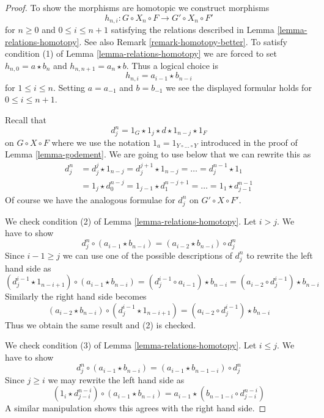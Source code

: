 \begin{proof}
To show the morphisms are homotopic we construct morphisms
$$
h_{n, i} : G \circ X_n \circ F \to G' \circ X_n \circ F'
$$
for $n \geq 0$ and $0 \leq i \leq n + 1$
satisfying the relations described in Lemma \ref{lemma-relations-homotopy}.
See also Remark \ref{remark-homotopy-better}. To satisfy condition (1)
of Lemma \ref{lemma-relations-homotopy} we are forced to set
$h_{n, 0} = a \star b_n$ and $h_{n , n + 1} = a_n \star b$.
Thus a logical choice is
$$
h_{n , i} = a_{i - 1} \star b_{n - i}
$$
for $1 \leq i \leq n$. Setting $a = a_{-1}$ and $b = b_{-1}$ we
see the displayed formular holds for $0 \leq i \leq n + 1$.

\medskip\noindent
Recall that
$$
d^n_j = 1_G \star 1_j \star d \star 1_{n - j} \star 1_F
$$
on $G \circ X \circ F$ where we use
the notation $1_a = 1_{Y \circ \ldots \circ Y}$ introduced
in the proof of Lemma \ref{lemma-godement}. We are going to use below
that we can rewrite this as
\begin{align*}
d^n_j
& =
d^j_j \star 1_{n - j} =
d^{j + 1}_j \star 1_{n - j} = \ldots = d^{n - 1}_j \star 1_1 \\
& =
1_j \star d^{n - j}_0 = 1_{j - 1} \star d^{n - j + 1}_1 = \ldots =
1_1 \star d^{n - 1}_{j - 1}
\end{align*}
Of course we have the analogous formulae for $d^n_j$ on $G' \circ X \circ F'$.

\medskip\noindent
We check condition (2) of Lemma \ref{lemma-relations-homotopy}.
Let $i > j$. We have to show
$$
d^n_j \circ (a_{i - 1} \star b_{n - i}) =
(a_{i - 2} \star b_{n - i}) \circ d^n_j
$$
Since $i - 1 \geq j$ we can use one of the possible descriptions of
$d^n_j$ to rewrite the left hand side as
$$
(d^{i - 1}_j \star 1_{n - i + 1}) \circ (a_{i - 1} \star b_{n - i}) =
(d^{i - 1}_j \circ a_{i - 1}) \star b_{n - i} =
(a_{i - 2} \circ d^{i - 1}_j) \star b_{n - i}
$$
Similarly the right hand side becomes
$$
(a_{i - 2} \star b_{n - i}) \circ (d^{i - 1}_j \star 1_{n - i + 1}) =
(a_{i - 2} \circ d^{i - 1}_j) \star b_{n - i}
$$
Thus we obtain the same result and (2) is checked.

\medskip\noindent
We check condition (3) of Lemma \ref{lemma-relations-homotopy}.
Let $i \leq j$. We have to show
$$
d^n_j \circ (a_{i - 1} \star b_{n - i}) =
(a_{i - 1} \star b_{n - 1 - i}) \circ d^n_j
$$
Since $j \geq i$ we may rewrite the left hand side as
$$
(1_i \star d^{n - i}_{j - i}) \circ (a_{i - 1} \star b_{n - i}) =
a_{i - 1} \star (b_{n - 1 - i} \circ d^{n - i}_{j - i})
$$
A similar manipulation shows this agrees with the right hand side.


\end{proof}
